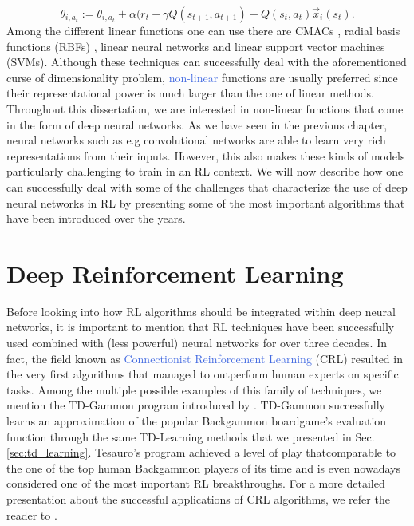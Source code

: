 \begin{equation}
	\theta_{i,a_t} := \theta_{i,a_t} + \alpha(r_t +\gamma Q(s_{t+1},a_{t+1}) - Q(s_t, a_t)\vec{x}_i(s_t).
\end{equation}
Among the different linear functions one can use there are CMACs \cite{lane1992theory}, radial basis functions (RBFs) \cite{park1993approximation}, linear neural networks \cite{mcculloch1943logical} and linear support vector machines (SVMs). Although these techniques can successfully deal with the aforementioned curse of dimensionality problem, \textcolor{RoyalBlue}{non-linear} functions are usually preferred since their representational power is much larger than the one of linear methods. Throughout this dissertation, we are interested in non-linear functions that come in the form of deep neural networks. As we have seen in the previous chapter, neural networks such as e.g convolutional networks are able to learn very rich representations from their inputs. However, this also makes these kinds of models particularly challenging to train in an RL context. We will now describe how one can successfully deal with some of the challenges that characterize the use of deep neural networks in RL by presenting some of the most important algorithms that have been introduced over the years.    

\section{Deep Reinforcement Learning}
\label{sec:deep_reinforcement_learning}
Before looking into how RL algorithms should be integrated within deep neural networks, it is important to mention that RL techniques have been successfully used combined with (less powerful) neural networks for over three decades. In fact, the field known as \textcolor{RoyalBlue}{Connectionist Reinforcement Learning} (CRL) resulted in the very first algorithms that managed to outperform human experts on specific tasks. Among the multiple possible examples of this family of techniques, we mention the TD-Gammon program introduced by \citet{tesauro1994td}. TD-Gammon successfully learns an approximation of the popular Backgammon boardgame's evaluation function through the same TD-Learning methods that we presented in Sec. \ref{sec:td_learning}. Tesauro's program achieved a level of play thatcomparable to the one of the top human Backgammon players of its time and is even nowadays considered one of the most important RL breakthroughs. For a more detailed presentation about the successful applications of CRL algorithms, we refer the reader to \cite{bucsoniu2011approximate}.  

